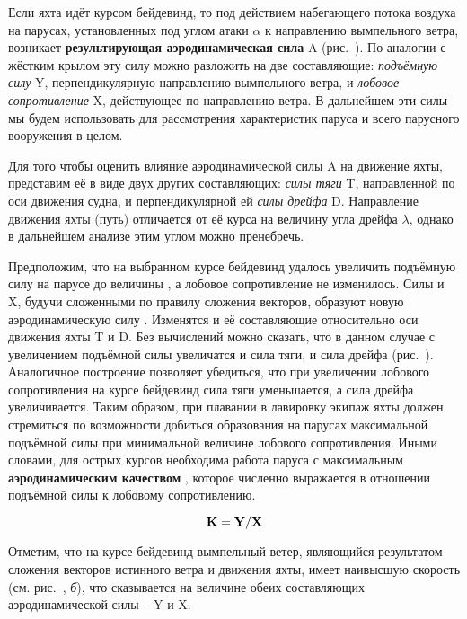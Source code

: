 Если яхта идёт курсом бейдевинд, то под действием набегающего потока
воздуха на парусах, установленных под углом атаки $\alpha$ к
направлению вымпельного ветра, возникает \textbf{результирующая
  аэродинамическая сила} \ve
A (рис.~). По
аналогии с жёстким крылом эту силу можно разложить на две
составляющие: \textit{подъёмную силу} \ve Y,
перпендикулярную направлению вымпельного ветра, и \textit{лобовое
сопротивление}
 \ve X, действующее по
направлению ветра. В дальнейшем эти силы мы будем использовать для
рассмотрения характеристик паруса и всего парусного вооружения в
целом.

Для того чтобы оценить влияние аэродинамической силы \ve A на движение
яхты, представим её в виде двух других составляющих: \textit{силы тяги} \ve T,
направленной по оси движения судна, и перпендикулярной ей \textit{силы дрейфа}
\ve D. Направление движения яхты (путь) отличается от её курса на
величину угла дрейфа $\lambda$, однако в дальнейшем анализе этим углом
можно пренебречь.

Предположим, что на выбранном курсе бейдевинд удалось увеличить
подъёмную силу на парусе до величины , а лобовое
сопротивление не изменилось. Силы  и \ve X, будучи
сложенными по правилу сложения векторов, образуют новую
аэродинамическую силу . Изменятся и её составляющие
относительно оси движения яхты \ve T и \ve D. Без вычислений можно
сказать, что в данном случае с увеличением подъёмной силы увеличатся и
сила тяги, и сила дрейфа (рис.~). Аналогичное построение
позволяет убедиться, что при увеличении лобового сопротивления на
курсе бейдевинд сила тяги уменьшается, а сила дрейфа
увеличивается. Таким образом, при плавании в лавировку экипаж яхты
должен стремиться по возможности добиться образования на парусах
максимальной подъёмной силы при минимальной величине лобового
сопротивления. Иными словами, для острых курсов необходима работа
паруса с максимальным \textbf{аэродинамическим качеством}
, которое численно
выражается в отношении подъёмной силы к лобовому сопротивлению.

\begin{equation}
\mathbf{K} = \mathbf{Y} / \mathbf{X}
\end{equation}

Отметим, что на курсе бейдевинд вымпельный ветер, являющийся
результатом сложения векторов истинного ветра и движения яхты, имеет
наивысшую скорость  (см. рис.~, \textit{б}), что
сказывается на величине обеих составляющих аэродинамической силы \---
\ve Y и \ve X.

